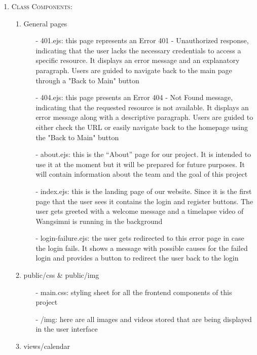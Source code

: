 \documentclass[conference]{IEEEtran}
\begin{document}
\begin{enumerate}
    \item \textsc{Class Components:}
        \begin{enumerate}
            \item General pages
                \begin{itemize}
                    \item[-] 401.ejs: this page represents an Error 401 - Unauthorized response, indicating that the user lacks the necessary credentials to access a specific resource. It displays an error message and an explanatory paragraph. Users are guided to navigate back to the main page through a "Back to Main" button
                    \item[-] 404.ejs: this page presents an Error 404 - Not Found message, indicating that the requested resource is not available. It displays an error message along with a descriptive paragraph. Users are guided to either check the URL or easily navigate back to the homepage using the "Back to Main" button
                    \item[-] about.ejs: this is the “About” page for our project. It is intended to use it at the moment but it will be prepared for future purposes. It will contain information about the team and the goal of this project
                    \item[-] index.ejs: this is the landing page of our website. Since it is the first page that the user sees it contains the login and register buttons. The user gets greeted with a welcome message and a timelapse video of Wangsimni is running in the background
                    \item[-] login-failure.ejs: the user gets redirected to this error page in case the login fails. It shows a message with possible causes for the failed login and provides a button to redirect the user back to the login
                \end{itemize}
            \item public/css \& public/img
                \begin{itemize}
                    \item[-] main.css: styling sheet for all the frontend components of this project
                    \item[-] /img: here are all images and videos stored that are being displayed in the user interface
                \end{itemize}
            \item views/calendar
                \begin{itemize}

\end{itemize}
\end{enumerate}
\end{enumerate}
\end{document}
